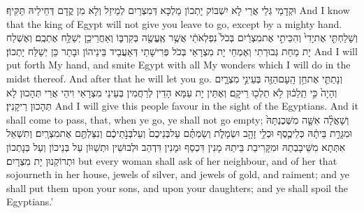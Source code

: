 {וּקְדָמַי גְּלֵי אֲרֵי לָא יִשְׁבּוֹק יָתְכוֹן מַלְכָּא דְּמִצְרַיִם לְמֵיזַל וְלָא מִן קֳדָם דְּחֵילֵיהּ תַּקִּיף׃}
{And I know that the king of Egypt will not give you leave to go, except by a mighty hand.}{}
{וְשָׁלַחְתִּ֤י אֶת\maqqaf יָדִי֙ וְהִכֵּיתִ֣י אֶת\maqqaf מִצְרַ֔יִם בְּכֹל֙ נִפְלְאֹתַ֔י אֲשֶׁ֥ר אֶֽעֱשֶׂ֖ה בְּקִרְבּ֑וֹ וְאַחֲרֵי\maqqaf כֵ֖ן יְשַׁלַּ֥ח אֶתְכֶֽם׃}
{וְאֶשְׁלַח יָת מַחַת גְּבוּרְתִי וְאֶמְחֵי יָת מִצְרָאֵי בְּכֹל פְּרִישָׁתַי דְּאַעֲבֵיד בֵּינֵיהוֹן וּבָתַר כֵּן יְשַׁלַּח יָתְכוֹן׃}
{And I will put forth My hand, and smite Egypt with all My wonders which I will do in the midst thereof. And after that he will let you go.}{}
{וְנָתַתִּ֛י אֶת\maqqaf חֵ֥ן הָֽעָם\maqqaf הַזֶּ֖ה בְּעֵינֵ֣י מִצְרָ֑יִם וְהָיָה֙ כִּ֣י תֵֽלֵכ֔וּן לֹ֥א תֵלְכ֖וּ רֵיקָֽם׃}
{וְאֶתֵּין יָת עַמָּא הָדֵין לְרַחֲמִין בְּעֵינֵי מִצְרָאֵי וִיהֵי אֲרֵי תְּהָכוּן לָא תְּהָכוּן רֵיקָנִין׃}
{And I will give this people favour in the sight of the Egyptians. And it shall come to pass, that, when ye go, ye shall not go empty;}{}
{וְשָׁאֲלָ֨ה אִשָּׁ֤ה מִשְּׁכֶנְתָּהּ֙ וּמִגָּרַ֣ת בֵּיתָ֔הּ כְּלֵי\maqqaf כֶ֛סֶף וּכְלֵ֥י זָהָ֖ב וּשְׂמָלֹ֑ת וְשַׂמְתֶּ֗ם עַל\maqqaf בְּנֵיכֶם֙ וְעַל\maqqaf בְּנֹ֣תֵיכֶ֔ם וְנִצַּלְתֶּ֖ם אֶת\maqqaf מִצְרָֽיִם׃}
{וְתִשְׁאַל אִתְּתָא מִשֵּׁיבָבְתַהּ וּמִקָּרִיבַת בֵּיתַהּ מָנִין דִּכְסַף וּמָנִין דִּדְהַב וּלְבוּשִׁין וּתְשַׁוּוֹן עַל בְּנֵיכוֹן וְעַל בְּנָתְכוֹן וּתְרוֹקְנוּן יָת מִצְרָיִם׃}
{but every woman shall ask of her neighbour, and of her that sojourneth in her house, jewels of silver, and jewels of gold, and raiment; and ye shall put them upon your sons, and upon your daughters; and ye shall spoil the Egyptians.’}{}
